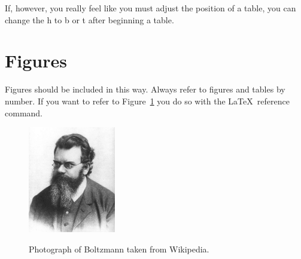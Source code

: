 \documentclass[letterpaper,article,11pt,oneside]{memoir}
\begin{document}
If, however, you really feel like you must adjust the position of a table, you can change the h to b or t after beginning a table. 

\section{Figures}
Figures should be included in this way. Always refer to figures and tables by number. If you want to refer to Figure~\ref{fig-boltzmann} you do so with the \LaTeX\ reference command. 
\begin{figure}[h]
\caption{Photograph of Boltzmann taken from Wikipedia.}
\includegraphics[width=1.5in]{figs/Boltzmann2.jpg}
\label{fig-boltzmann}
\end{figure}
\end{document}
